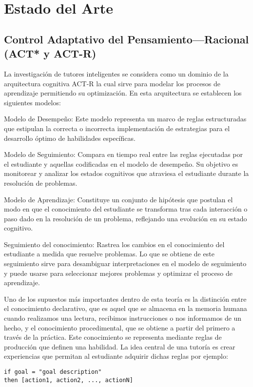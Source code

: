 
\chapter{Estado del Arte}

\section{Control Adaptativo del Pensamiento—Racional (ACT* y ACT-R)}

La investigación de tutores inteligentes se considera \cite{Anderson_act_1990}  como un dominio de la arquitectura cognitiva ACT-R la cual sirve para modelar los procesos de aprendizaje permitiendo su optimización. En esta arquitectura se establecen los siguientes modelos:

Modelo de Desempeño: Este modelo representa un marco de reglas estructuradas que estipulan la correcta o incorrecta implementación de estrategias para el desarrollo óptimo de habilidades específicas.

Modelo de Seguimiento: Compara en tiempo real entre las reglas ejecutadas por el estudiante y aquellas codificadas en el modelo de desempeño. Su objetivo es monitorear y analizar los estados cognitivos que atraviesa el estudiante durante la resolución de problemas.

Modelo de Aprendizaje: Constituye un conjunto de hipótesis que postulan el modo en que el conocimiento del estudiante se transforma tras cada interacción o paso dado en la resolución de un problema, reflejando una evolución en su estado cognitivo.

Seguimiento del conocimiento: Rastrea los cambios en el conocimiento del estudiante a medida que resuelve problemas. Lo que se obtiene de este seguimiento sirve para desambiguar interpretaciones en el modelo de seguimiento y puede usarse para seleccionar mejores problemas y optimizar el proceso de aprendizaje.

Uno de los supuestos más importantes dentro de esta teoría es la distinción entre el conocimiento declarativo, que es aquel que se almacena en la memoria humana cuando realizamos una lectura, recibimos instrucciones o nos informamos de un hecho, y el conocimiento procedimental, que se obtiene a partir del primero a través de la práctica. Este conocimiento se representa mediante reglas de producción que definen una habilidad. La idea central de una tutoría es crear experiencias que permitan al estudiante adquirir dichas reglas por ejemplo:

\begin{lstlisting}
if goal = "goal description"
then [action1, action2, ..., actionN]
\end{lstlisting}

